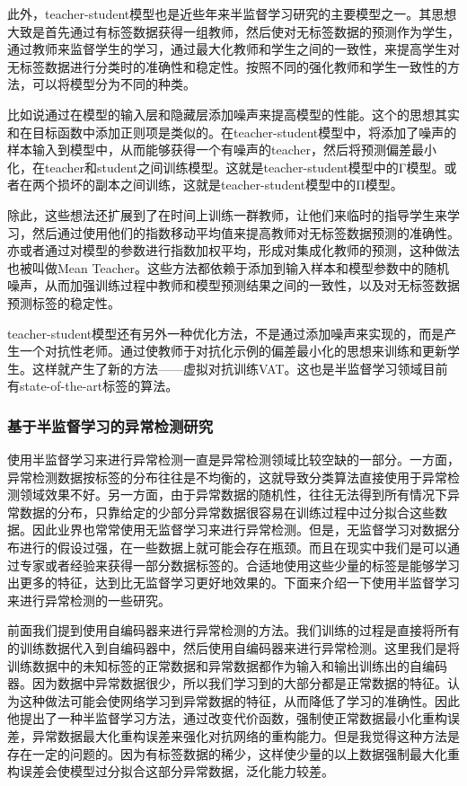 此外，teacher-student模型也是近些年来半监督学习研究的主要模型之一。其思想大致是首先通过有标签数据获得一组教师，然后使对无标签数据的预测作为学生，通过教师来监督学生的学习，通过最大化教师和学生之间的一致性，来提高学生对无标签数据进行分类时的准确性和稳定性。按照不同的强化教师和学生一致性的方法，可以将模型分为不同的种类。

比如说通过在模型的输入层和隐藏层添加噪声\cite{DBLP:journals/jmlr/SrivastavaHKSS14}来提高模型的性能。这个的思想其实和在目标函数中添加正则项是类似的。在teacher-student模型中，将添加了噪声的样本输入到模型中，从而能够获得一个有噪声的teacher，然后将预测偏差最小化，在teacher和student之间训练模型。这就是teacher-student模型中的Γ模型\cite{DBLP:conf/nips/RasmusBHVR15}。或者在两个损坏的副本之间训练，这就是teacher-student模型中的Π模型\cite{DBLP:conf/iclr/LaineA17}。

除此，这些想法还扩展到了在时间上训练一群教师，让他们来临时的指导学生来学习，然后通过使用他们的指数移动平均值来提高教师对无标签数据预测的准确性\cite{DBLP:conf/iclr/LaineA17}。亦或者通过对模型的参数进行指数加权平均，形成对集成化教师的预测，这种做法也被叫做Mean Teacher\cite{DBLP:conf/iclr/TarvainenV17}。这些方法都依赖于添加到输入样本和模型参数中的随机噪声，从而加强训练过程中教师和模型预测结果之间的一致性，以及对无标签数据预测标签的稳定性。

teacher-student模型还有另外一种优化方法，不是通过添加噪声来实现的，而是产生一个对抗性老师。通过使教师于对抗化示例的偏差最小化的思想来训练和更新学生。这样就产生了新的方法——虚拟对抗训练VAT\cite{DBLP:journals/pami/MiyatoMKI19}。这也是半监督学习领域目前有state-of-the-art标签的算法。

\subsubsection{基于半监督学习的异常检测研究}

使用半监督学习来进行异常检测一直是异常检测领域比较空缺的一部分。一方面，异常检测数据按标签的分布往往是不均衡的，这就导致分类算法直接使用于异常检测领域效果不好。另一方面，由于异常数据的随机性，往往无法得到所有情况下异常数据的分布，只靠给定的少部分异常数据很容易在训练过程中过分拟合这些数据。因此业界也常常使用无监督学习来进行异常检测。但是，无监督学习对数据分布进行的假设过强，在一些数据上就可能会存在瓶颈。而且在现实中我们是可以通过专家或者经验来获得一部分数据标签的\cite{DBLP:conf/cvpr/BilenV16}。合适地使用这些少量的标签是能够学习出更多的特征，达到比无监督学习更好地效果的。下面来介绍一下使用半监督学习来进行异常检测的一些研究。

前面我们提到使用自编码器来进行异常检测的方法。我们训练的过程是直接将所有的训练数据代入到自编码器中，然后使用自编码器来进行异常检测。这里我们是将训练数据中的未知标签的正常数据和异常数据都作为输入和输出训练出的自编码器。因为数据中异常数据很少，所以我们学习到的大部分都是正常数据的特征。\cite{DBLP:conf/mlsp/MunawarVM17}认为这种做法可能会使网络学习到异常数据的特征，从而降低了学习的准确性。因此他提出了一种半监督学习方法，通过改变代价函数，强制使正常数据最小化重构误差，异常数据最大化重构误差来强化对抗网络的重构能力。但是我觉得这种方法是存在一定的问题的。因为有标签数据的稀少，这样使少量的以上数据强制最大化重构误差会使模型过分拟合这部分异常数据，泛化能力较差。

